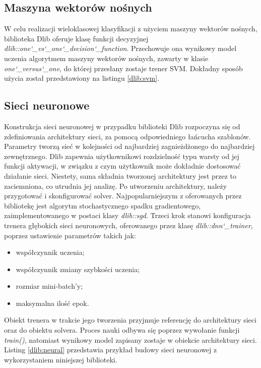 \subsection{Maszyna wektorów nośnych}

W celu realizacji wieloklasowej klasyfikacji z użyciem maszyny wektorów nośnych, biblioteka Dlib oferuje klasę funkcji decyzyjnej \textit{dlib::one\char`_vs\char`_one\char`_decision\char`_function}. Przechowuje ona wynikowy model uczenia algorytmem maszyny wektorów nośnych, zawarty w klasie \textit{one\char`_versus\char`_one}, do której przesłany zostaje trener SVM. Dokładny sposób użycia został przedstawiony na listingu \ref{dlib:svm}.


\subsection{Sieci neuronowe}

Konstrukcja sieci neuronowej w przypadku biblioteki Dlib rozpoczyna się od zdefiniowania architektury sieci, za pomocą odpowiedniego łańcucha szablonów. Parametry tworzą sieć w kolejności od najbardziej zagnieżdżonego do najbardziej zewnętrznego. Dlib zapewnia użytkownikowi rozdzielność typu warsty od jej funkcji aktywacji, w związku z czym użytkownik może dokładnie dostosować działanie sieci. Niestety, sama składnia tworzonej architektury jest przez to zaciemniona, co utrudnia jej analizę. Po utworzeniu architektury, należy przygotować i skonfigurować solver. Najpopularniejszym z oferowanych przez bibliotekę jest algorytm stochastycznego spadku gradientowego, zaimplementowanego w postaci klasy \textit{dlib::sgd}. Trzeci krok stanowi konfiguracja trenera głębokich sieci neuronowych, oferowanego przez klasę \textit{dlib::dnn\char`_trainer}, poprzez ustawienie parametrów takich jak:

\begin{itemize}
	\item współczynnik uczenia;
	\item współczynnik zmiany szybkości uczenia; 
	\item rozmiar mini-batch'y;
	\item maksymalna ilość epok.
\end{itemize}

Obiekt trenera w trakcie jego tworzenia przyjmuje referencję do architektury sieci oraz do obiektu solvera. Proces nauki odbywa się poprzez wywołanie funkcji \textit{train()}, natomiast wynikowy model zapisany zostaje w obiekcie architektury sieci. Listing \ref{dlib:neural} przedstawia przykład budowy sieci neuronowej z wykorzystaniem niniejszej biblioteki.

